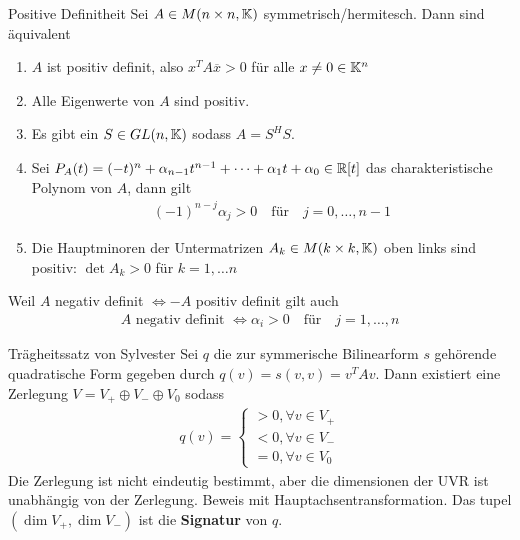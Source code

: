 \begin{satz}{Positive Definitheit}
    Sei $A \in M(n\times n,\mathbb{K})$ symmetrisch/hermitesch. Dann sind äquivalent
    \begin{enumerate}
        \item   $A$ ist positiv definit, also $x^TA \overline{x} > 0$ für alle $x \neq 0 \in \mathbb{K}^n$
        \item   Alle Eigenwerte von $A$ sind positiv.
        \item   Es gibt ein $S \in GL(n,\mathbb{K})$ sodass $A = S^HS$.
        \item   Sei $P_A(t) = (-t)^n + \alpha_{n-1} t^{n-1} + \cdots + \alpha_1t + \alpha_0 \in \mathbb{R}[t]$ das charakteristische Polynom von $A$, dann gilt 
        \begin{align*}
            (-1)^{n-j}\alpha_j > 0 \quad \text{für} \quad j = 0, \ldots, n-1
        \end{align*}
        \item   Die Hauptminoren der Untermatrizen $A_k \in M(k\times k,\mathbb{K})$ oben links sind positiv: \quad $\det A_k > 0$ für $k = 1, \ldots n$
    \end{enumerate}
    Weil $A$ negativ definit $\Leftrightarrow -A$ positiv definit gilt auch
    \begin{align*}
        A \text{ negativ definit } \Leftrightarrow \alpha_i > 0 \quad \text{für} \quad j = 1, \ldots, n
    \end{align*}
\end{satz}




\begin{nosatz}{Trägheitssatz von Sylvester}
    Sei $q$ die zur symmerische Bilinearform $s$ gehörende quadratische Form gegeben durch $q(v) = s(v,v) = v^TAv$. Dann existiert eine Zerlegung $V = V_+ \oplus V_- \oplus V_0$ sodass 
    \begin{align*}
        q(v) = \begin{cases}
            > 0, \forall v \in V_+\\
            < 0, \forall v \in V_-\\
            = 0, \forall v \in V_0
        \end{cases}
    \end{align*}
    Die Zerlegung ist nicht eindeutig bestimmt, aber die dimensionen der UVR ist unabhängig von der Zerlegung. Beweis mit Hauptachsentransformation.
    Das tupel $(\dim V_+, \dim V_-)$ ist die \textbf{Signatur} von $q$.
\end{nosatz}

